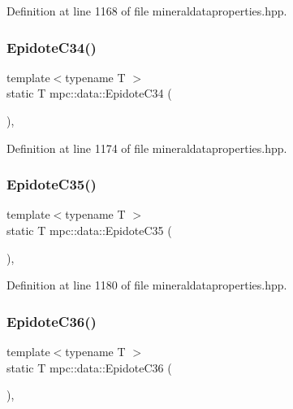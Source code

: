 Definition at line 1168 of file mineraldataproperties.\+hpp.

\mbox{\label{namespacempc_1_1data_ae98ab6a66c0009d18adc18b52453c87f}} 
\subsubsection{\texorpdfstring{Epidote\+C34()}{EpidoteC34()}}
{\footnotesize\ttfamily template$<$typename T $>$ \\
static T mpc\+::data\+::\+Epidote\+C34 (\begin{DoxyParamCaption}{ }\end{DoxyParamCaption})\hspace{0.3cm}{\ttfamily [inline]}, {\ttfamily [static]}}



Definition at line 1174 of file mineraldataproperties.\+hpp.

\mbox{\label{namespacempc_1_1data_a44b81ca494765b62a7ff847144bbf5dd}} 
\subsubsection{\texorpdfstring{Epidote\+C35()}{EpidoteC35()}}
{\footnotesize\ttfamily template$<$typename T $>$ \\
static T mpc\+::data\+::\+Epidote\+C35 (\begin{DoxyParamCaption}{ }\end{DoxyParamCaption})\hspace{0.3cm}{\ttfamily [inline]}, {\ttfamily [static]}}



Definition at line 1180 of file mineraldataproperties.\+hpp.

\mbox{\label{namespacempc_1_1data_aea058006af58f5fba5e871c6534bb6d3}} 
\subsubsection{\texorpdfstring{Epidote\+C36()}{EpidoteC36()}}
{\footnotesize\ttfamily template$<$typename T $>$ \\
static T mpc\+::data\+::\+Epidote\+C36 (\begin{DoxyParamCaption}{ }\end{DoxyParamCaption})\hspace{0.3cm}{\ttfamily [inline]}, {\ttfamily [static]}}



